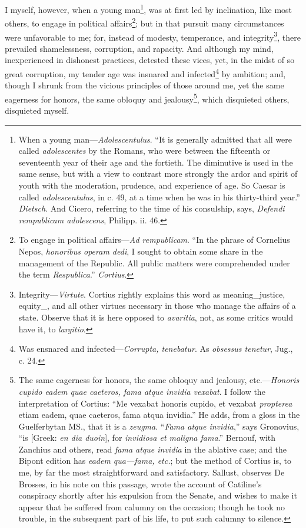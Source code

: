 I myself, however, when a young man\footnote{When a young man—\emph{Adolescentulus}. ``It is generally admitted
that all were called \emph{adolescentes} by the Romans, who were between
the fifteenth or seventeenth year of their age and the fortieth.
The diminutive is used in the same sense, but with a view to contrast
more strongly the ardor and spirit of youth with the moderation,
prudence, and experience of age. So Caesar is called \emph{adolescentulus},
in c. 49, at a time when he was in his thirty-third year.'' \emph{Dietsch}.
And Cicero, referring to the time of his consulship, says, \emph{Defendi
rempublicam adolescens}, Philipp. ii. 46.}, was at first led by
inclination, like most others, to engage in political affairs\footnote{To engage in political affairs—\emph{Ad rempublicam}. ``In the phrase
of Cornelius Nepos, \emph{honoribus operam dedi}, I sought to obtain some
share in the management of the Republic. All public matters were
comprehended under the term \emph{Respublica}.'' \emph{Cortius}.}; but
in that pursuit many circumstances were unfavorable to me; for,
instead of modesty, temperance, and integrity\footnote{Integrity—\emph{Virtute}. Cortius rightly explains this word as
meaning\_justice, equity\_, and all other virtues necessary in those who
manage the affairs of a state. Observe that it is here opposed to
\emph{avaritia}, not, as some critics would have it, to \emph{largitio}.}, there prevailed
shamelessness, corruption, and rapacity. And although my mind,
inexperienced in dishonest practices, detested these vices, yet, in
the midst of so great corruption, my tender age was insnared and
infected\footnote{Was ensnared and infected—\emph{Corrupta, tenebatur}. As
\emph{obsessus tenetur}, Jug., c. 24.} by ambition; and, though I shrunk from the vicious
principles of those around me, yet the same eagerness for honors, the
same obloquy and jealousy\footnote{The same eagerness for honors, the same obloquy and
jealousy, etc.—\emph{Honoris cupido eadem quae caeteros, fama atque
invidia vexabat}. I follow the interpretation of Cortius: ``Me vexabat
honoris cupido, et vexabat \emph{propterea} etiam eadem, quae caeteros,
fama atqua invidia.'' He adds, from a gloss in the Guelferbytan MS.,
that it is a \emph{zeugma}. ``\emph{Fama atque invidia},'' says Gronovius, ``is
[Greek: \emph{en dia duoin}], for \emph{invidiosa et maligna fama}.'' Bernouf,
with Zanchius and others, read \emph{fama atque invidia} in the ablative
case; and the Bipont edition has \emph{eadem qua—fama, etc.}; but the
method of Cortius is, to me, by far the most straightforward and
satisfactory. Sallust, observes De Brosses, in his note on this
passage, wrote the account of Catiline's conspiracy shortly after his
expulsion from the Senate, and wishes to make it appear that he
suffered from calumny on the occasion; though he took no trouble, in
the subsequent part of his life, to put such calumny to silence.}, which disquieted others, disquieted
myself.

